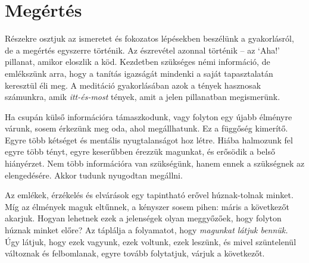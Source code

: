 \chapter{Megértés}


\noindent Részekre osztjuk az ismeretet és fokozatos lépésekben
beszélünk a gyakorlásról, de a megértés egyszerre történik. Az
észrevétel azonnal történik -- az `Aha!' pillanat, amikor eloszlik a
köd. Kezdetben szükséges némi információ, de emlékszünk arra, hogy a
tanítás igazságát mindenki a saját tapasztalatán keresztül éli meg. A
meditáció gyakorlásában azok a tények hasznosak számunkra, amik
\emph{itt-és-most} tények, amit a jelen pillanatban megismerünk.

Ha csupán külső információra támaszkodunk, vagy folyton egy újabb
élményre várunk, sosem érkezünk meg oda, ahol megállhatunk. Ez a
függőség kimerítő. Egyre több kétséget és mentális nyugtalanságot hoz
létre. Hiába halmozunk fel egyre több tényt, egyre keserűbben érezzük
magunkat, és erősödik a belső hiányérzet. Nem több információra van
szükségünk, hanem ennek a szükségnek az elengedésére. Akkor tudunk
nyugodtan megállni.


Az emlékek, érzékelés és elvárások egy tapintható erővel húznak-tolnak
minket. Míg az élmények maguk eltűnnek, a kényszer sosem pihen: máris a
következőt akarjuk. Hogyan lehetnek ezek a jelenségek olyan meggyőzőek,
hogy folyton húznak minket előre? Az táplálja a folyamatot, hogy
\emph{magunkat látjuk bennük.} Úgy látjuk, hogy ezek vagyunk, ezek
voltunk, ezek leszünk, és mivel szüntelenül változnak és felbomlanak,
egyre tovább folytatjuk, várjuk a következőt.

\clearpage
\figurepagelayout

